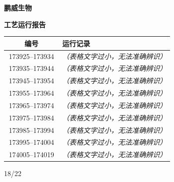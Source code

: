 \documentclass[UTF8,10pt,a4paper,fontset=fandol]{ctexart}
\newcommand{\handwritten}[1]{#1}
\begin{document}
\begin{minipage}[t]{0.48\textwidth}
\centering
\textbf{鹏威生物}\par
\vspace{1mm}
\textbf{工艺运行报告}\par
\vspace{1mm}
\begin{tabular}{|c|p{0.67\linewidth}|}
\hline
\textbf{编号} & \textbf{运行记录} \\ \hline
173925--173934 & \textit{（表格文字过小，无法准确辨识）} \\ \hline
173935--173944 & \textit{（表格文字过小，无法准确辨识）} \\ \hline
173945--173954 & \textit{（表格文字过小，无法准确辨识）} \\ \hline
173955--173964 & \textit{（表格文字过小，无法准确辨识）} \\ \hline
173965--173974 & \textit{（表格文字过小，无法准确辨识）} \\ \hline
173975--173984 & \textit{（表格文字过小，无法准确辨识）} \\ \hline
173985--173994 & \textit{（表格文字过小，无法准确辨识）} \\ \hline
173995--174004 & \textit{（表格文字过小，无法准确辨识）} \\ \hline
174005--174019 & \textit{（表格文字过小，无法准确辨识）} \\ \hline
\end{tabular}

\vspace{3mm}
\handwritten{18/22}
\end{minipage}

\newpage
\end{document}
